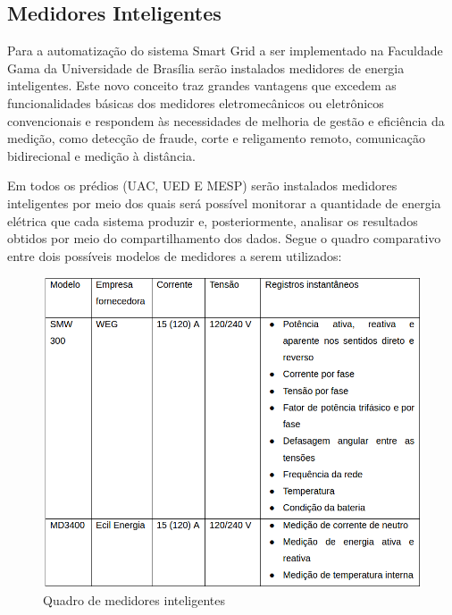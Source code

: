 \subsection{Medidores Inteligentes}
Para a automatização do sistema Smart Grid a ser implementado na Faculdade Gama da Universidade de Brasília serão instalados medidores de energia inteligentes. Este novo conceito traz grandes vantagens que excedem as funcionalidades básicas dos medidores eletromecânicos ou eletrônicos convencionais e respondem às necessidades de melhoria de gestão e eficiência da medição, como detecção de fraude, corte e religamento remoto, comunicação bidirecional e medição à distância.

Em todos os prédios (UAC, UED E MESP) serão instalados medidores inteligentes por meio dos quais será possível monitorar a quantidade de energia elétrica que cada sistema produzir e, posteriormente, analisar os resultados obtidos por meio do compartilhamento dos dados. Segue o quadro comparativo entre dois possíveis modelos de medidores a serem utilizados:
\begin{figure}[!h]
	\centering
	\includegraphics[width=1.0\textwidth]{figuras/quadroMedidoresInteligentes.png}
	\caption{Quadro de medidores inteligentes}
	\label{fig:medidoresinteligentes}
\end{figure}

